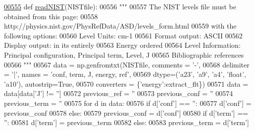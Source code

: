 \begin{DoxyCode}
\hypertarget{namespacepyneb_1_1utils_1_1manage__atomic__data_l00555}{}\hyperlink{namespacepyneb_1_1utils_1_1manage__atomic__data_ab843a6f51ebb888e83a849835e49a885}{00555} \textcolor{keyword}{def }\hyperlink{namespacepyneb_1_1utils_1_1manage__atomic__data_ab843a6f51ebb888e83a849835e49a885}{readNIST}(NISTfile):
00556     \textcolor{stringliteral}{"""}
00557 \textcolor{stringliteral}{    The NIST levels file must be obtained from this page:}
00558 \textcolor{stringliteral}{        http://physics.nist.gov/PhysRefData/ASD/levels\_form.html}
00559 \textcolor{stringliteral}{    with the following options:}
00560 \textcolor{stringliteral}{        Level Units: cm-1}
00561 \textcolor{stringliteral}{        Format output: ASCII}
00562 \textcolor{stringliteral}{        Display output: in its entirely}
00563 \textcolor{stringliteral}{        Energy ordered}
00564 \textcolor{stringliteral}{        Level Information: Principal configuration, Principal term, Level, J}
00565 \textcolor{stringliteral}{        Bibliographic references}
00566 \textcolor{stringliteral}{    """}
00567     data = np.genfromtxt(NISTfile, comments = \textcolor{stringliteral}{'-'}, 
00568                     delimiter = \textcolor{stringliteral}{'|'}, names = \textcolor{stringliteral}{'conf, term, J, energy, ref'}, 
00569                     dtype=(\textcolor{stringliteral}{'a23'}, \textcolor{stringliteral}{'a9'}, \textcolor{stringliteral}{'a4'}, \textcolor{stringliteral}{'float'}, \textcolor{stringliteral}{'a10'}), autostrip=\textcolor{keyword}{True},
00570                     converters = \{\textcolor{stringliteral}{'energy'}:extract\_flt\})
00571     data = data[data[\textcolor{stringliteral}{'J'}] != \textcolor{stringliteral}{''}]
00572     previous\_ref = \textcolor{stringliteral}{''}
00573     previous\_conf = \textcolor{stringliteral}{''}
00574     previous\_term = \textcolor{stringliteral}{''}
00575     \textcolor{keywordflow}{for} d \textcolor{keywordflow}{in} data:
00576         \textcolor{keywordflow}{if} d[\textcolor{stringliteral}{'conf'}] == \textcolor{stringliteral}{''}:
00577             d[\textcolor{stringliteral}{'conf'}] = previous\_conf
00578         \textcolor{keywordflow}{else}:
00579             previous\_conf = d[\textcolor{stringliteral}{'conf'}]
00580         \textcolor{keywordflow}{if} d[\textcolor{stringliteral}{'term'}] == \textcolor{stringliteral}{''}:
00581             d[\textcolor{stringliteral}{'term'}] = previous\_term
00582         \textcolor{keywordflow}{else}:
00583             previous\_term = d[\textcolor{stringliteral}{'term'}]

\end{DoxyCode}
